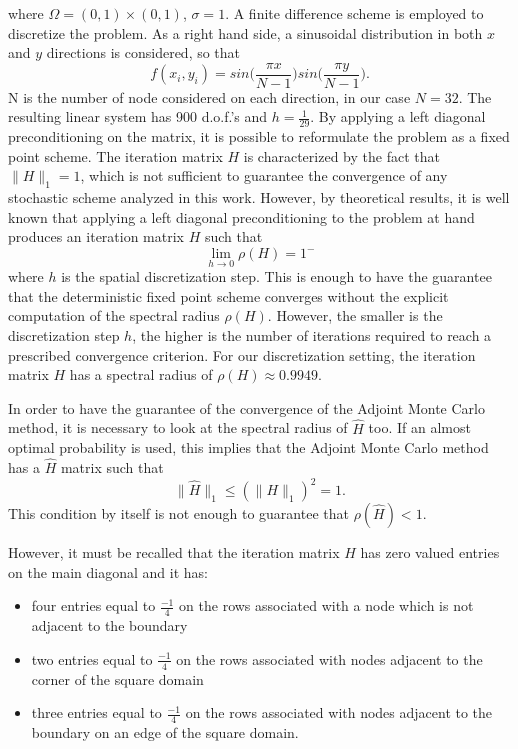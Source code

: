 \documentclass[a4paper,10pt]{article}
\begin{document}
where $\Omega=(0,1)\times (0,1)$, $\sigma=1$. 
A finite difference scheme is employed to discretize the problem.
As a right hand side, a 
sinusoidal distribution in both $x$ and $y$ directions is considered, so that 
\[
 f(x_i, y_i)=sin\bigg(\frac{\pi x}{N-1}\bigg)sin\bigg(\frac{\pi y}{N-1}\bigg).
\]
N is the number of node considered on each direction, in our case $N=32$. The 
resulting linear system has 900 d.o.f.'s and $h=\frac{1}{29}$.
By applying a left diagonal preconditioning on the matrix, it is possible to 
reformulate the problem as a fixed point scheme. 
The iteration matrix $H$ is characterized by the fact that $\lVert 
H\rVert_1=1$, which is not sufficient to guarantee the convergence of 
any 
stochastic scheme analyzed in this work. However, by theoretical results, it is 
well known that applying a left diagonal preconditioning to the problem at hand 
produces an iteration matrix $H$ such that
\[
 \lim_{h\rightarrow 0}\rho(H)=1^{-}
\]
where $h$ is the spatial discretization step.
This is enough to have the guarantee that the deterministic fixed point scheme 
converges without the explicit computation of the spectral radius $\rho(H)$. 
However, the smaller is the discretization step $h$, the higher is the number of 
iterations required to reach a prescribed convergence criterion. For our 
discretization setting, the iteration matrix $H$ has a 
spectral radius of $\rho(H)\approx 0.9949$.

In order to have the guarantee of the convergence of the Adjoint Monte Carlo 
method, it is necessary to look at the spectral radius of $\hat{H}$ too. If an 
almost optimal probability is used, this implies that 
the Adjoint Monte Carlo method has a $\hat{H}$ matrix such that 
\[
 \lVert \hat{H}\rVert_1\le (\rVert H\rVert_1)^2=1.
\]
This condition by itself is not enough to guarantee that 
$\rho(\hat{H})<1$. 

However, it must be recalled that the iteration matrix $H$ has zero 
valued entries on the main diagonal and it has: 
\begin{itemize}
 \item four entries equal to $\frac{-1}{4}$ on the rows associated 
with a node which is not adjacent to the boundary
\item two entries equal to $\frac{-1}{4}$ on the rows associated with nodes 
adjacent to the corner of the square domain
\item three entries equal to $\frac{-1}{4}$ on the rows associated with nodes 
adjacent to the boundary on an edge of the square domain.
\end{itemize}
\end{document}
